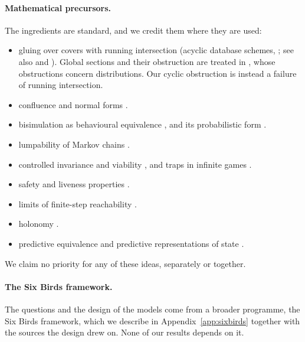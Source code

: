 \paragraph{Mathematical precursors.}
The ingredients are standard, and we credit them where they are used:
\begin{itemize}
\item gluing over covers with running intersection (acyclic database schemes,
\citealp[Theorem~3.4]{BeeriEtAl1983}; see also \citealp{Vorobev1962} and
\citealp{Abramsky2013}). Global sections and their obstruction are treated in
\citet{AbramskyBrandenburger2011}, whose obstructions concern distributions. Our
cyclic obstruction is instead a failure of running intersection.
\item confluence and normal forms \citep{Newman1942, BaaderNipkow1998}.
\item bisimulation as behavioural equivalence \citep{Park1981, Milner1989},
and its probabilistic form \citep{LarsenSkou1991}.
\item lumpability of Markov chains \citep{KemenySnell1976}.
\item controlled invariance and viability \citep{Blanchini1999, Aubin1991},
and traps in infinite games \citep{Mazala2002}.
\item safety and liveness properties \citep{AlpernSchneider1985}.
\item limits of finite-step reachability \citep{Bertsekas1972}.
\item holonomy \citep{Nakahara2003}.
\item predictive equivalence \citep{ShaliziCrutchfield2001} and predictive
representations of state \citep{LittmanSuttonSingh2002}.
\end{itemize}
We claim no priority for any of these ideas, separately or together.

\paragraph{The Six Birds framework.}
The questions and the design of the models come from a broader programme, the
Six Birds framework, which we describe in Appendix~\ref{app:sixbirds} together
with the sources the design drew on. None of our results depends on it.
